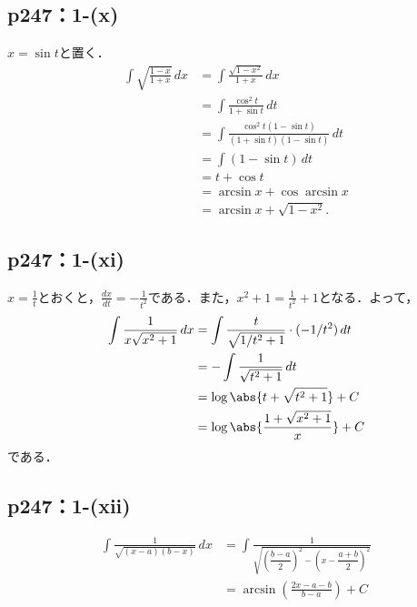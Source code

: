 \documentclass[a4paper,10pt,fleqn]{ltjsarticle}
\begin{document}
\subsection*{p247：1-(x)}

  \begin{leftbar}
    $x = \sin t$と置く．
    \begin{align*}
      \int \sqrt {\frac{1-x}{1+x}} \,dx
      &= \int \frac{\sqrt{1-x^2}}{1+x} \,dx \\
      &= \int \frac{\cos^2 t}{1 + \sin t} \,dt \\
      &= \int \frac{\cos^2 t(1 - \sin t)}{(1 + \sin t)(1 - \sin t)} \,dt \\
      &= \int (1 - \sin t) \,dt \\
      &= t + \cos t \\
      &= \arcsin x  + \cos \arcsin x \\
      &= \arcsin x + \sqrt{1-x^2}.
    \end{align*}
  \end{leftbar}

\subsection*{p247：1-(xi)}


\begin{tleftbar}
    $x=\frac{1}{t}$とおくと，$\frac{dx}{dt}=-\frac{1}{t^2}$である．また，$x^2+1 = \frac{1}{t^2} +1$となる．よって，
    \begin{align*} 
        \int \frac{1}{x\sqrt{x^2+1}} \, dx & = \int \frac{t}{\sqrt{1/t^2+1}} \cdot (-1/t^2) \, dt \\
        & = -\int \frac{1}{\sqrt{t^2+1}} \, dt \\
        & = \log \abs{t+\sqrt{t^2+1}}+ C \\
        & = \log \abs{\frac{1+\sqrt{x^2+1}}{x}}+C
    \end{align*}
    である．
\end{tleftbar}


\subsection*{p247：1-(xii)}


\begin{tleftbar}
    \begin{align*} 
        \int \frac{1}{\sqrt{(x-a)(b-x)}} \, dx & = \int \frac{1}{\sqrt{\left (\dfrac{b-a}{2} \right )^2 - \left (x-\dfrac{a+b}{2} \right )^2 }} \\
        & = \arcsin \left(\frac{2x-a-b}{b-a} \right)+C
    \end{align*}
\end{tleftbar}
\end{document}
